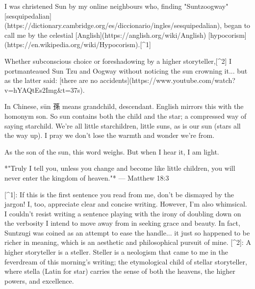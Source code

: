 I was christened Sun by my online neighbours who, finding "Suntzoogway" [sesquipedalian](https://dictionary.cambridge.org/es/diccionario/ingles/sesquipedalian), began to call me by the celestial [Anglish](https://anglish.org/wiki/Anglish) [hypocorism](https://en.wikipedia.org/wiki/Hypocorism).[^1]

Whether subconscious choice or foreshadowing by a higher storyteller,[^2] I portmanteaued Sun Tzu and Oogway without noticing the sun crowning it... but as the latter said: [there are no accidents](https://www.youtube.com/watch?v=hYAQtEs2Img&t=37s).

In Chinese, sūn 孫 means grandchild, descendant. English mirrors this with the homonym son. So sun contains both the child and the star; a compressed way of saying starchild. We're all little starchildren, little suns, as is our sun (stars all the way up). I pray we don't lose the warmth and wonder we're from.

As the son of the sun, this word weighs. But when I hear it, I am light.

*"Truly I tell you, unless you change and become like little children, you will never enter the kingdom of heaven."* — Matthew 18:3

[^1]: If this is the first sentence you read from me, don't be dismayed by the jargon! I, too, appreciate clear and concise writing. However, I'm also whimsical. I couldn't resist writing a sentence playing with the irony of doubling down on the verbosity I intend to move away from in seeking grace and beauty. In fact, Suntzugi was coined as an attempt to ease the handle... it just so happened to be richer in meaning, which is an aesthetic and philosophical pursuit of mine.
[^2]: A higher storyteller is a steller. Steller is a neologism that came to me in the feverdream of this morning's writing; the etymological child of stellar storyteller, where stella (Latin for star) carries the sense of both the heavens, the higher powers, and excellence.